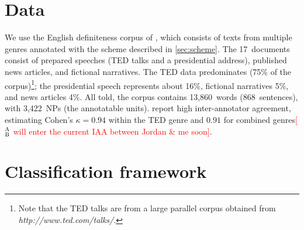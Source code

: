 \documentclass[11pt,letterpaper]{article}
\newcommand{\ensuretext}[1]{#1}
\newcommand{\nssmarker}{\ensuretext{\textcolor{magenta}{\ensuremath{^{\textsc{NS}}_{\textsc{S}}}}}}
\newcommand{\abmarker}{\ensuretext{\textcolor{red}{\ensuremath{^{\textsc{A}}_{\textsc{B}}}}}}
\newcommand{\arkcomment}[3]{\ensuretext{\textcolor{#3}{[#1 #2]}}}
\newcommand{\nss}[1]{\arkcomment{\nssmarker}{#1}{magenta}}
\newcommand{\ab}[1]{\arkcomment{\abmarker}{#1}{red}}
\newcommand{\finalversion}[1]{}
\begin{document}
\section{Data}\label{sec:data}

We use the English definiteness corpus of \citet{bhatia14}, 
which consists of texts from multiple genres annotated with the scheme described in \cref{sec:scheme}. 
The 17~documents consist of prepared speeches (TED talks and a presidential address), 
published news articles, and fictional narratives. 
The TED data predominates (75\% of the corpus)\footnote{Note that the TED talks are from a large parallel corpus obtained from {\it http://www.ted.com/talks/}.}; 
the presidential speech represents about 16\%, fictional narratives 5\%, and news articles 4\%. 
All told, the corpus contains 13,860~words (868~sentences), with 3,422~NPs (the annotatable units). 
\citet{bhatia14} report high inter-annotator agreement, estimating Cohen's $\kappa = 0.94$ within the TED genre 
and $0.91$ for combined genres\ab{will enter the current IAA between Jordan \& me soon}\finalversion{\nss{update---this was on a previous version of the annotation scheme.}}.  


\section{Classification framework}\label{sec:modeling}
\end{document}
